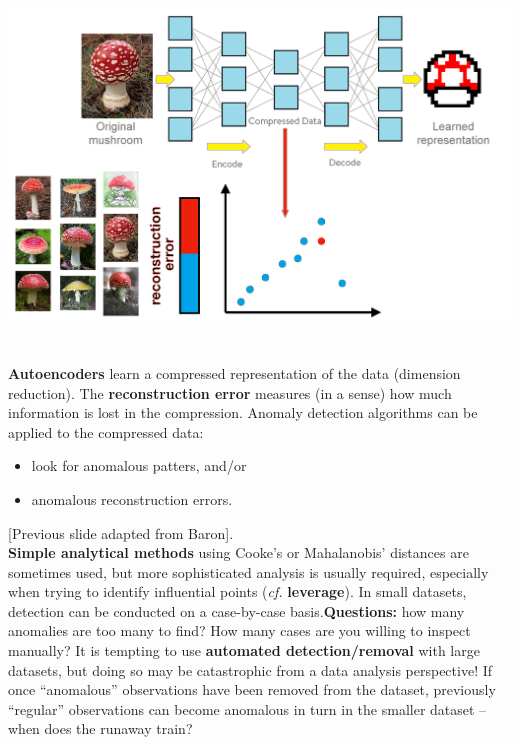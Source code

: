 \documentclass[20pt,landscape,footrule,headrule]{foils}
\newcommand{\newl}{\newline\newline}
\begin{document}
\newpage
\begin{center}
\includegraphics[width=\textwidth]{Images/autoencoder2.png}
\end{center}
\newpage \ \\ \noindent
\noindent \textbf{Autoencoders} learn a compressed representation of the data (dimension reduction).
\newl The \textbf{reconstruction error} measures (in a sense) how much information is lost in the compression. 
\newl Anomaly detection algorithms can be applied to the compressed data:
\begin{itemize}
\item look for anomalous patters, and/or
\item anomalous reconstruction errors. 
\end{itemize}
[Previous slide adapted from Baron].
\newpage\ \\ \noindent
\textbf{Simple analytical methods} using Cooke's or Mahalanobis' distances are sometimes used, but more sophisticated analysis is usually required, especially when trying to identify influential points (\textit{cf.} \textbf{leverage}). 
\newl 
In small datasets, detection can be conducted on a case-by-case basis.\newl \textbf{Questions:} how many anomalies are too many to find? How many cases are you willing to inspect manually? 
\newl It is tempting to use \textbf{automated detection/removal} with large datasets, but doing so may be catastrophic from a data analysis perspective!
\newl If once ``anomalous'' observations have been removed from the dataset, previously ``regular'' observations can become anomalous in turn in the smaller dataset -- when does the runaway train?
\newpage\ \\ 
\end{document}
